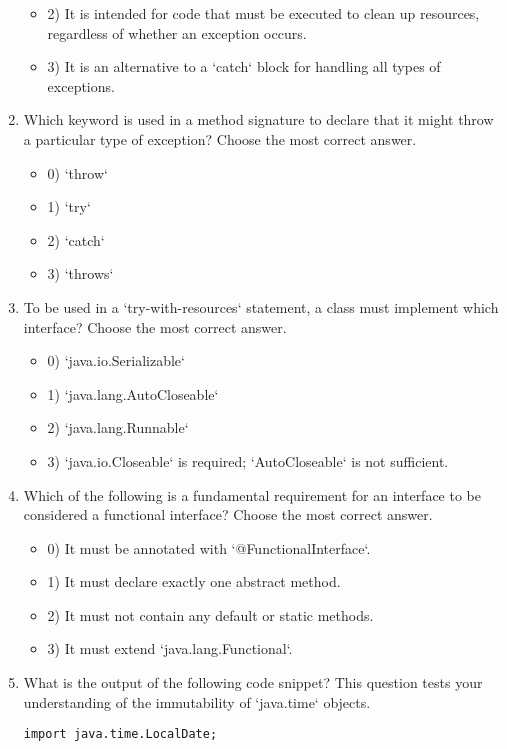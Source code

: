\documentclass[12pt]{article}
\begin{document}
\begin{enumerate}[label=(\arabic*)]
\begin{itemize}
\item 2) It is intended for code that must be executed to clean up resources, regardless of whether an exception occurs.
\item 3) It is an alternative to a `catch` block for handling all types of exceptions.
\end{itemize}
\item Which keyword is used in a method signature to declare that it might throw a particular type of exception?
Choose the most correct answer. 
\begin{itemize}
\item 0) `throw`
\item 1) `try`
\item 2) `catch`
\item 3) `throws`
\end{itemize}
\item To be used in a `try-with-resources` statement, a class must implement which interface?
Choose the most correct answer. 
\begin{itemize}
\item 0) `java.io.Serializable`
\item 1) `java.lang.AutoCloseable`
\item 2) `java.lang.Runnable`
\item 3) `java.io.Closeable` is required; `AutoCloseable` is not sufficient.
\end{itemize}
\item Which of the following is a fundamental requirement for an interface to be considered a functional interface?
Choose the most correct answer. 
\begin{itemize}
\item 0) It must be annotated with `@FunctionalInterface`.
\item 1) It must declare exactly one abstract method.
\item 2) It must not contain any default or static methods.
\item 3) It must extend `java.lang.Functional`.
\end{itemize}
\item What is the output of the following code snippet? This question tests your understanding of the immutability of `java.time` objects.
\begin{verbatim}
import java.time.LocalDate;


\end{verbatim}
\end{enumerate}
\end{document}
